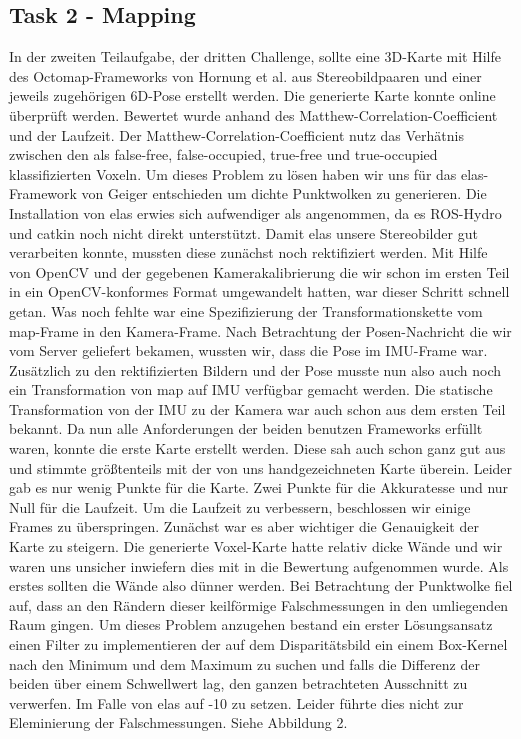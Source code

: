 \documentclass[12pt,titlepage, a4paper]{article}
\begin{document}
\subsection{Task 2 - Mapping}
In der zweiten Teilaufgabe, der dritten Challenge, sollte eine 3D-Karte mit Hilfe des Octomap-Frameworks von Hornung et al. aus Stereobildpaaren und einer jeweils zugehörigen 6D-Pose erstellt werden. Die generierte Karte konnte online überprüft werden. Bewertet wurde anhand des Matthew-Correlation-Coefficient und der Laufzeit. Der Matthew-Correlation-Coefficient nutz das Verhätnis zwischen den als false-free, false-occupied, true-free und true-occupied klassifizierten Voxeln.
Um dieses Problem zu lösen haben wir uns für das elas-Framework von Geiger entschieden um dichte Punktwolken zu generieren.
Die Installation von elas erwies sich aufwendiger als angenommen, da es ROS-Hydro und catkin noch nicht direkt unterstützt. Damit elas unsere Stereobilder gut verarbeiten konnte, mussten diese zunächst noch rektifiziert werden. Mit Hilfe von OpenCV und der gegebenen Kamerakalibrierung die wir schon im ersten Teil in ein OpenCV-konformes Format umgewandelt hatten, war dieser Schritt schnell getan. Was noch fehlte war eine Spezifizierung der Transformationskette vom map-Frame in den Kamera-Frame. Nach Betrachtung der Posen-Nachricht die wir vom Server geliefert bekamen, wussten wir, dass die Pose im IMU-Frame war. Zusätzlich zu den rektifizierten Bildern und der Pose musste nun also auch noch ein Transformation von map auf IMU verfügbar gemacht werden. Die statische Transformation von der IMU zu der Kamera war auch schon aus dem ersten Teil bekannt. Da nun alle Anforderungen der beiden benutzen Frameworks erfüllt waren, konnte die erste Karte erstellt werden. Diese sah auch schon ganz gut aus und stimmte größtenteils mit der von uns handgezeichneten Karte überein. Leider gab es nur wenig Punkte für die Karte. Zwei Punkte für die Akkuratesse und nur Null für die Laufzeit. Um die Laufzeit zu verbessern, beschlossen wir einige Frames zu überspringen. Zunächst war es aber wichtiger die Genauigkeit der Karte zu steigern. Die generierte Voxel-Karte hatte relativ dicke Wände und wir waren uns unsicher inwiefern dies mit in die Bewertung aufgenommen wurde. Als erstes sollten die Wände also dünner werden. Bei Betrachtung der Punktwolke fiel auf, dass an den Rändern dieser keilförmige Falschmessungen in den umliegenden Raum gingen. Um dieses Problem anzugehen bestand ein erster Lösungsansatz einen Filter zu implementieren der auf dem Disparitätsbild ein einem Box-Kernel nach den Minimum und dem Maximum zu suchen und falls die Differenz der beiden über einem Schwellwert lag, den ganzen betrachteten Ausschnitt zu verwerfen. Im Falle von elas auf -10 zu setzen. Leider führte dies nicht zur Eleminierung der Falschmessungen. Siehe Abbildung 2.
\end{document}
